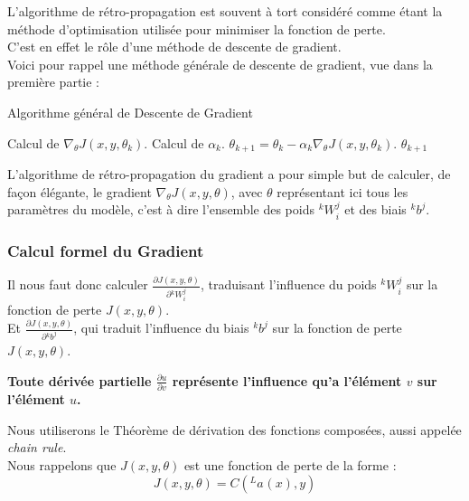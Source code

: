 \documentclass[10pt,a4paper]{report}
\newcommand{\lexp}[1]{\phantom{}^{#1}}
\newcommand{\elem}[4]{\lexp{#2}#1^{#3}_{#4}}
\begin{document}
		L'algorithme de rétro-propagation est souvent à tort considéré comme étant la méthode d'optimisation utilisée pour minimiser la fonction de perte.\\
		C'est en effet le rôle d'une méthode de descente de gradient.\\
		Voici pour rappel une méthode générale de descente de gradient, vue dans la première partie :
		\begin{algorithm}[H]
			\caption{Algorithme général de Descente de Gradient}
			\begin{algorithmic}
			    \REPEAT
			    	\STATE Calcul de $\nabla_\theta J(x,y,\theta_k)$.
			    	\STATE Calcul de $\alpha_k$.
			    	\STATE $\theta_{k+1} = \theta_k - \alpha_k \nabla_\theta J(x,y,\theta_k)$.
			    \RETURN $\theta_{k+1}$
			\end{algorithmic}
		\end{algorithm}
		L'algorithme de rétro-propagation du gradient a pour simple but de calculer, de façon élégante, le gradient $\nabla_\theta J(x,y,\theta)$, avec $\theta$ représentant ici tous les paramètres du modèle, c'est à dire l'ensemble des poids $\elem{W}{k}{j}{i}$ et des biais $\elem{b}{k}{j}{}$.\\
		
			\subsubsection{Calcul formel du Gradient}
			
				Il nous faut donc calculer $\frac{\partial J(x,y,\theta)}{\partial \elem{W}{k}{j}{i}}$, traduisant l'influence du poids $\elem{W}{k}{j}{i}$ sur la fonction de perte $J(x,y,\theta)$.\\
				Et $\frac{\partial J(x,y,\theta)}{\partial \elem{b}{k}{j}{}}$, qui traduit l'influence du biais $\elem{b}{k}{j}{}$ sur la fonction de perte $J(x,y,\theta)$.\\
				\begin{center}
				\textbf{Toute dérivée partielle $\frac{\partial u}{\partial v}$ représente l'influence qu'a l'élément $v$ sur l'élément $u$.}
				\end{center}
				Nous utiliserons le Théorème de dérivation des fonctions composées, aussi appelée \emph{chain rule}.\\
				Nous rappelons que $J(x,y,\theta)$ est une fonction de perte de la forme :
				$$J(x,y,\theta) = C(\elem{a}{L}{}{}(x),y)$$
				
\end{document}
